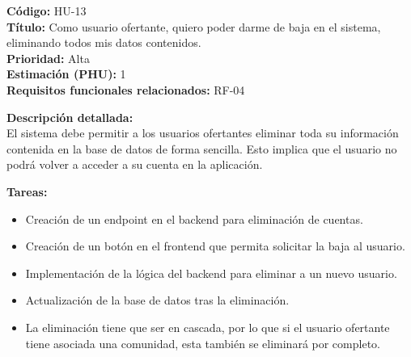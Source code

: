 \begin{tarjetaHU}
\textbf{Código:} HU-13 \\
\textbf{Título:} Como usuario ofertante, quiero poder darme de baja en el sistema, eliminando todos mis datos contenidos. \\
\textbf{Prioridad:} Alta \\
\textbf{Estimación (PHU):} 1 \\
\textbf{Requisitos funcionales relacionados:} RF-04

\vspace{0.5em}
\textbf{Descripción detallada:} \\
El sistema debe permitir a los usuarios ofertantes eliminar toda su información contenida en la base de datos de forma sencilla. Esto implica que el usuario no podrá volver a acceder a su cuenta en la aplicación.

\vspace{0.5em}
\textbf{Tareas:}
\begin{itemize}[left=0pt]
  \item Creación de un endpoint en el backend para eliminación de cuentas.
  \item Creación de un botón en el frontend que permita solicitar la baja al usuario.
  \item Implementación de la lógica del backend para eliminar a un nuevo usuario.
  \item Actualización de la base de datos tras la eliminación.
  \item La eliminación tiene que ser en cascada, por lo que si el usuario ofertante tiene asociada una comunidad, esta también se eliminará por completo.
\end{itemize}


\end{tarjetaHU}
